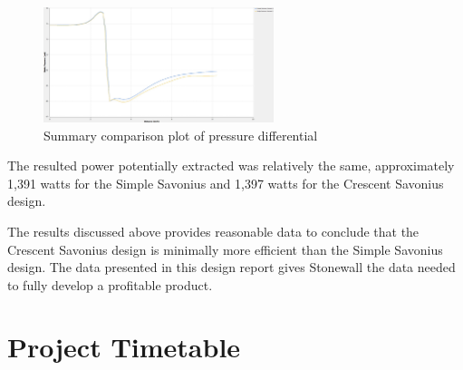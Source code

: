 \documentclass[12pt]{article}
\begin{document}
\begin{figure}[H]
\begin{center}
\includegraphics[width=0.6\textwidth]{sppd}
\caption[p1] {Summary comparison plot of pressure differential}
\label{sppd}
\end{center}
\end{figure}
\hspace{0.5 in}The resulted power potentially extracted was relatively the same, approximately 1,391 watts for the Simple Savonius and 1,397 watts for the Crescent Savonius design.

\hspace{0.5 in} The results discussed above provides reasonable data to conclude that the Crescent Savonius design is minimally more efficient than the Simple Savonius design. The data presented in this design report gives Stonewall the data needed to fully develop a profitable product.
%
%
\vspace{-0.1in}
\section{Project Timetable}
\label{sec:Time}
\vspace{-0.2in}
\doublespacing
\end{document}
